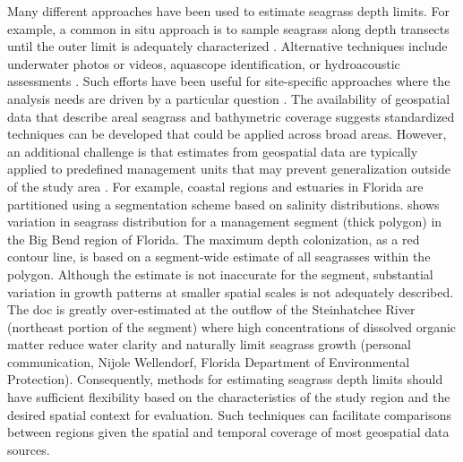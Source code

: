 \documentclass[letterpaper,12pt,oneside]{article}\usepackage[]{graphicx}\usepackage[]{color}
\begin{document}
Many different approaches have been used to estimate seagrass depth limits.  For example, a common in situ approach is to sample seagrass along depth transects until the outer limit is adequately characterized \citep[e.g.,][]{Spears09}.  Alternative techniques include underwater photos or videos, aquascope identification, or hydroacoustic assessments \citep{Zhu07,Sondergaard13}.  Such efforts have been useful for site-specific approaches where the analysis needs are driven by a particular question \citep[e.g.,][]{Iverson86,Hale04}. The availability of geospatial data that describe areal seagrass and bathymetric coverage suggests standardized techniques can be developed that could be applied across broad areas.  However, an additional challenge is that estimates from geospatial data are typically applied to predefined management units that may prevent generalization outside of the study area \citep[e.g.,][]{Steward05}. For example, coastal regions and estuaries in Florida are partitioned using a segmentation scheme based on salinity distributions.   shows variation in seagrass distribution for a management segment (thick polygon) in the Big Bend region of Florida.  The maximum depth colonization, as a red contour line, is based on a segment-wide estimate of all seagrasses within the polygon.  Although the estimate is not inaccurate for the segment, substantial variation in growth patterns at smaller spatial scales is not adequately described.  The \ac{doc} is greatly over-estimated at the outflow of the Steinhatchee River (northeast portion of the segment) where high concentrations of dissolved organic matter reduce water clarity and naturally limit seagrass growth (personal communication, Nijole Wellendorf, Florida Department of Environmental Protection).  Consequently, methods for estimating seagrass depth limits should have sufficient flexibility based on the characteristics of the study region and the desired spatial context for evaluation.  Such techniques can facilitate comparisons between regions given the spatial and temporal coverage of most geospatial data sources.  
\end{document}
